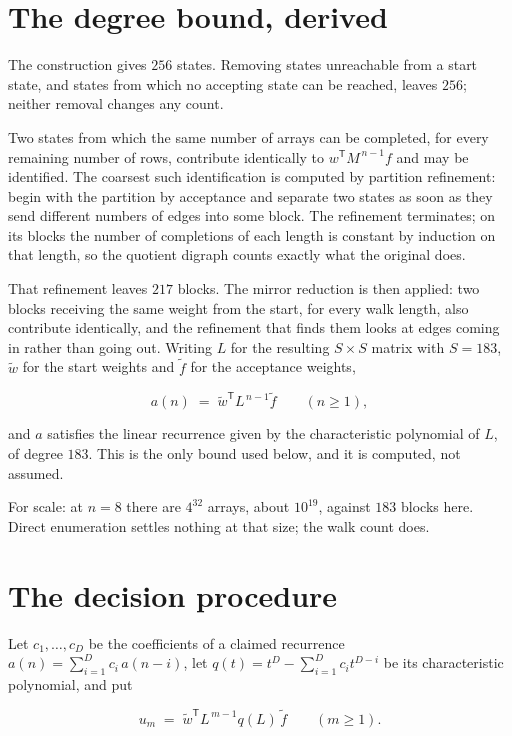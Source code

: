 \documentclass[11pt]{article}
\theoremstyle{definition}
\begin{document}
\section{The degree bound, derived}

The construction gives $256$ states. Removing states unreachable from a start state, and states from which no accepting state can be reached, leaves $256$; neither removal changes any count.

Two states from which the same number of arrays can be completed, for every remaining number of rows, contribute identically to $w^{\mathsf T}M^{\,n-1}f$ and may be identified. The coarsest such identification is computed by partition refinement: begin with the partition by acceptance and separate two states as soon as they send different numbers of edges into some block. The refinement terminates; on its blocks the number of completions of each length is constant by induction on that length, so the quotient digraph counts exactly what the original does.

That refinement leaves $217$ blocks. The mirror reduction is then applied: two blocks receiving the same weight from the start, for every walk length, also contribute identically, and the refinement that finds them looks at edges coming in rather than going out. Writing $L$ for the resulting $S \times S$ matrix with $S = 183$, $\tilde w$ for the start weights and $\tilde f$ for the acceptance weights,

\[a(n) \;=\; \tilde w^{\mathsf T} L^{\,n-1} \tilde f \qquad (n \ge 1),\]

and $a$ satisfies the linear recurrence given by the characteristic polynomial of $L$, of degree $183$. This is the only bound used below, and it is computed, not assumed.

For scale: at $n = 8$ there are $4^{32}$ arrays, about $10^{19}$, against $183$ blocks here. Direct enumeration settles nothing at that size; the walk count does.

\section{The decision procedure}

Let $c_1,\dots,c_D$ be the coefficients of a claimed recurrence $a(n) = \sum_{i=1}^{D} c_i\,a(n-i)$, let $q(t) = t^{D} - \sum_{i=1}^{D} c_i t^{D-i}$ be its characteristic polynomial, and put

\[u_m \;=\; \tilde w^{\mathsf T} L^{\,m-1} q(L)\,\tilde f \qquad (m \ge 1).\]
\end{document}
